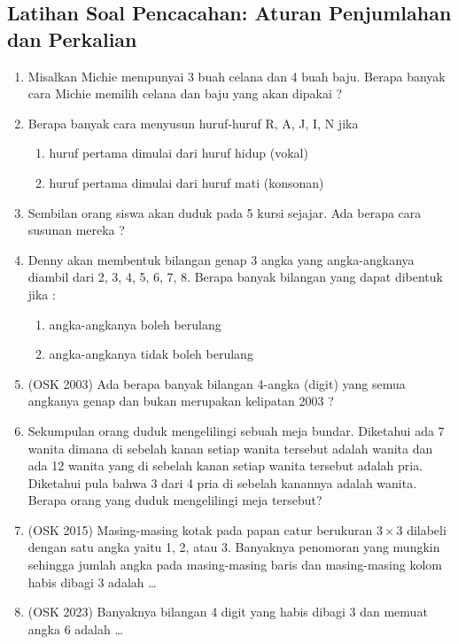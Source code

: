 \subsection{Latihan Soal Pencacahan: Aturan Penjumlahan dan Perkalian}
\begin{enumerate}
    \item Misalkan Michie mempunyai 3 buah celana dan 4 buah baju. Berapa banyak cara Michie memilih celana dan baju yang akan dipakai ?

    \item Berapa banyak cara menyusun huruf-huruf R, A, J, I, N jika 
    \begin{enumerate}
        \item huruf pertama dimulai dari huruf hidup (vokal) 
        \item huruf pertama dimulai dari huruf mati (konsonan) 
    \end{enumerate}

    \item Sembilan orang siswa akan duduk pada 5 kursi sejajar. Ada berapa cara susunan mereka ? 
    
    \item Denny akan membentuk bilangan genap 3 angka yang angka-angkanya diambil dari 2, 3, 4, 5, 6, 7, 8. Berapa banyak bilangan yang dapat dibentuk jika : 
    \begin{enumerate}
        \item angka-angkanya boleh berulang 
        \item angka-angkanya tidak boleh berulang
    \end{enumerate}

    \item (OSK 2003) Ada berapa banyak bilangan 4-angka (digit) yang semua angkanya genap dan bukan merupakan kelipatan 2003 ?

    \item Sekumpulan orang duduk mengelilingi sebuah meja bundar. Diketahui ada 7 wanita dimana di sebelah kanan setiap wanita tersebut adalah wanita dan ada 12 wanita yang di sebelah kanan setiap wanita tersebut adalah pria. Diketahui pula bahwa 3 dari 4 pria di sebelah kanannya adalah wanita. Berapa orang yang duduk mengelilingi meja tersebut?

    \item (OSK 2015) Masing-masing kotak pada papan catur berukuran $3 \times 3$ dilabeli dengan satu angka yaitu 1, 2, atau 3. Banyaknya penomoran yang mungkin sehingga jumlah angka pada masing-masing baris dan masing-masing kolom habis dibagi 3 adalah \ldots

    \item (OSK 2023) Banyaknya bilangan 4 digit yang habis dibagi 3 dan memuat angka 6 adalah \ldots
\end{enumerate}